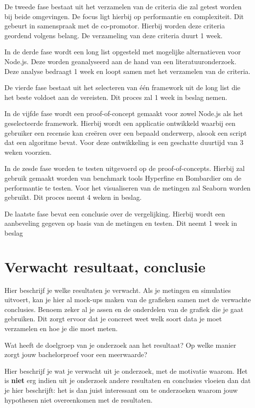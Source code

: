 De tweede fase bestaat uit het verzamelen van de criteria die zal getest worden bij beide omgevingen. 
De focus ligt hierbij op performantie en complexiteit.
Dit gebeurt in samenspraak met de co-promotor. Hierbij worden deze criteria geordend volgens belang. 
De verzameling van deze criteria duurt 1 week.

In de derde fase wordt een long list opgesteld met mogelijke alternatieven voor Node.js. 
Deze worden geanalyseerd aan de hand van een literatuuronderzoek. Deze analyse bedraagt 1 week en loopt samen met het verzamelen van de criteria.

De vierde fase bestaat uit het selecteren van één framework uit de long list die het beste voldoet aan de vereisten. 
Dit proces zal 1 week in beslag nemen.

In de vijfde fase wordt een proof-of-concept gemaakt voor zowel Node.js als het geselecteerde framework. 
Hierbij wordt een applicatie ontwikkeld waarbij een gebruiker een recensie kan creëren over een bepaald onderwerp, 
alsook een script dat een algoritme bevat.
Voor deze ontwikkeling is een geschatte duurtijd van 3 weken voorzien.

In de zesde fase worden te testen uitgevoerd op de proof-of-concepts. 
Hierbij zal gebruik gemaakt worden van benchmark tools Hyperfine en Bombardier om de performantie te testen.
Voor het visualiseren van de metingen zal Seaborn worden gebruikt.
Dit proces neemt 4 weken in beslag.

De laatste fase bevat een conclusie over de vergelijking. 
Hierbij wordt een aanbeveling gegeven op basis van de metingen en testen.
Dit neemt 1 week in beslag
\section{Verwacht resultaat, conclusie}%
\label{sec:verwachte_resultaten}

Hier beschrijf je welke resultaten je verwacht. Als je metingen en simulaties uitvoert, 
kan je hier al mock-ups maken van de grafieken samen met de verwachte conclusies. 
Benoem zeker al je assen en de onderdelen van de grafiek die je gaat gebruiken. 
Dit zorgt ervoor dat je concreet weet welk soort data je moet verzamelen en hoe je die moet meten.

Wat heeft de doelgroep van je onderzoek aan het resultaat? Op welke manier zorgt jouw bachelorproef voor een meerwaarde?

Hier beschrijf je wat je verwacht uit je onderzoek, met de motivatie waarom.
Het is \textbf{niet} erg indien uit je onderzoek andere resultaten en conclusies vloeien dan dat je hier beschrijft: 
het is dan juist interessant om te onderzoeken waarom jouw hypothesen niet overeenkomen met de resultaten.

